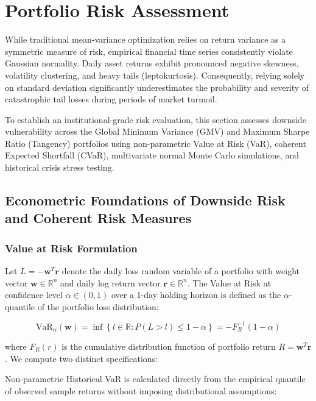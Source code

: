 \section{Portfolio Risk Assessment}

While traditional mean-variance optimization relies on return variance as a symmetric measure of risk, empirical financial time series consistently violate Gaussian normality. Daily asset returns exhibit pronounced negative skewness, volatility clustering, and heavy tails (leptokurtosis). Consequently, relying solely on standard deviation significantly underestimates the probability and severity of catastrophic tail losses during periods of market turmoil.

To establish an institutional-grade risk evaluation, this section assesses downside vulnerability across the Global Minimum Variance (GMV) and Maximum Sharpe Ratio (Tangency) portfolios using non-parametric Value at Risk (VaR), coherent Expected Shortfall (CVaR), multivariate normal Monte Carlo simulations, and historical crisis stress testing.

\subsection{Econometric Foundations of Downside Risk and Coherent Risk Measures}

\subsubsection{Value at Risk Formulation}

Let $L = -\mathbf{w}^T \mathbf{r}$ denote the daily loss random variable of a portfolio with weight vector $\mathbf{w} \in \mathbb{R}^n$ and daily log return vector $\mathbf{r} \in \mathbb{R}^n$. The Value at Risk at confidence level $\alpha \in (0, 1)$ over a 1-day holding horizon is defined as the $\alpha$-quantile of the portfolio loss distribution:

\begin{equation}
  \text{VaR}_\alpha(\mathbf{w}) = \inf \left\{ l \in \mathbb{R} : P(L > l) \le 1 - \alpha \right\} = -F_R^{-1}(1 - \alpha)
\end{equation}

where $F_R(r)$ is the cumulative distribution function of portfolio return $R = \mathbf{w}^T \mathbf{r}$. We compute two distinct specifications:

Non-parametric Historical VaR is calculated directly from the empirical quantile of observed sample returns without imposing distributional assumptions:

